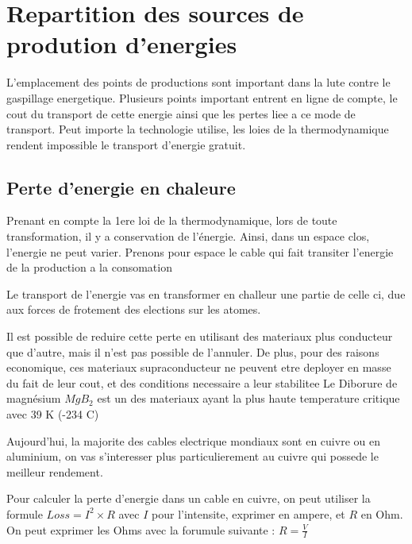 \chapter{Repartition des sources de prodution d'energies}

L'emplacement des points de productions sont important dans la lute contre le gaspillage energetique.
Plusieurs points important entrent en ligne de compte, le cout du transport de cette energie ainsi que les pertes liee a ce mode de transport.
Peut importe la technologie utilise, les loies de la thermodynamique rendent impossible le transport d'energie gratuit.

\section{Perte d'energie en chaleure}

Prenant en compte la 1ere loi de la thermodynamique, lors de toute transformation, il y a conservation de l'énergie.
Ainsi, dans un espace clos, l'energie ne peut varier.
Prenons pour espace le cable qui fait transiter l'energie de la production a la consomation

Le transport de l'energie vas en transformer en challeur une partie de celle ci, due aux forces de frotement des elections sur les atomes.

Il est possible de reduire cette perte en utilisant des materiaux plus conducteur que d'autre, mais il n'est pas possible de l'annuler.
De plus, pour des raisons economique, ces materiaux supraconducteur ne peuvent etre deployer en masse du fait de leur cout, et des conditions necessaire a leur stabilitee
Le Diborure de magnésium $MgB_2$ est un des materiaux ayant la plus haute temperature critique avec 39 K (-234 C)

Aujourd'hui, la majorite des cables electrique mondiaux sont en cuivre ou en aluminium, on vas s'interesser plus particulierement au cuivre qui possede le meilleur rendement.

Pour calculer la perte d'energie dans un cable en cuivre, on peut utiliser la formule $Loss = I^2\times R$ avec $I$ pour l'intensite, exprimer en ampere, et $R$ en Ohm.
On peut exprimer les Ohms avec la forumule suivante : $R = \frac{V}{I}$

